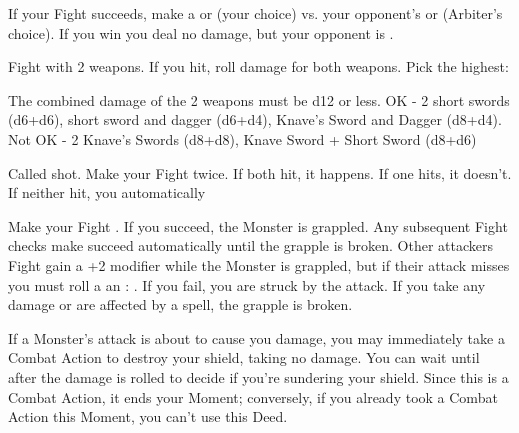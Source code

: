 {  If your Fight \RO succeeds, make a \RB \VIG or \RB \DEX (your choice) vs. your opponent's \VIG or \DEX (Arbiter's choice). If you win you deal no damage, but your opponent is .


  Fight with 2 weapons.  If you hit, roll damage for both weapons.  Pick the highest:

  The combined damage of the 2 weapons must be d12 or less.  OK - 2 short swords (d6+d6), short sword and dagger (d6+d4), Knave's Sword and Dagger (d8+d4).  Not OK - 2 Knave's Swords (d8+d8), Knave Sword + Short Sword (d8+d6)


  Called shot.  Make your Fight \RO twice.  If both hit, it happens.  If one hits, it doesn't.  If neither hit, you automatically 



  Make your Fight \RO.  If you succeed, the Monster is grappled.  Any subsequent Fight checks  make succeed automatically until the grapple is broken.  Other attackers Fight \RO gain a +2 modifier while the Monster is grappled, but if their attack misses you must roll a an \RS : \DEX.  If you fail, you are struck by the attack.  If you take any damage or are affected by a spell, the grapple is broken.


  If a Monster's attack is about to cause you  damage, you may immediately take a Combat Action to destroy your shield, taking no damage. You can wait until after the damage is rolled to decide if you're sundering your shield.  Since this is a Combat Action, it ends your Moment; conversely, if you already took a Combat Action this Moment, you can't use this Deed.



}
